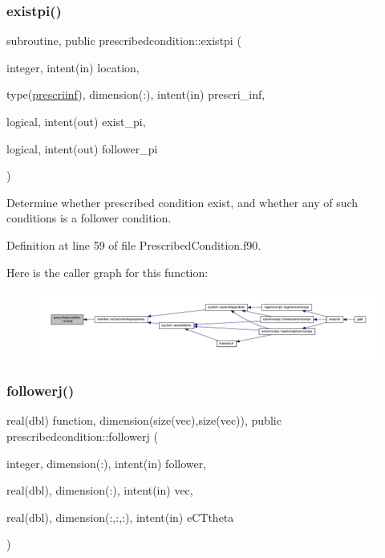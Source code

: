\subsubsection{\texorpdfstring{existpi()}{existpi()}}
{\footnotesize\ttfamily subroutine, public prescribedcondition\+::existpi (\begin{DoxyParamCaption}\item[{integer, intent(in)}]{location,  }\item[{type(\hyperlink{structprescribedcondition_1_1prescriinf}{prescriinf}), dimension(\+:), intent(in)}]{prescri\+\_\+inf,  }\item[{logical, intent(out)}]{exist\+\_\+pi,  }\item[{logical, intent(out)}]{follower\+\_\+pi }\end{DoxyParamCaption})}



Determine whether prescribed condition exist, and whether any of such conditions is a follower condition. 



Definition at line 59 of file Prescribed\+Condition.\+f90.

Here is the caller graph for this function\+:\nopagebreak
\begin{figure}[H]
\begin{center}
\leavevmode
\includegraphics[width=350pt]{namespaceprescribedcondition_acb722f1fdcfebc72bc33fb3162d9db6d_icgraph}
\end{center}
\end{figure}
\mbox{\label{namespaceprescribedcondition_a4c109cd4a8df6fedff99e15f448cf944}} 
\subsubsection{\texorpdfstring{followerj()}{followerj()}}
{\footnotesize\ttfamily real(dbl) function, dimension(size(vec),size(vec)), public prescribedcondition\+::followerj (\begin{DoxyParamCaption}\item[{integer, dimension(\+:), intent(in)}]{follower,  }\item[{real(dbl), dimension(\+:), intent(in)}]{vec,  }\item[{real(dbl), dimension(\+:,\+:,\+:), intent(in)}]{e\+C\+Ttheta }\end{DoxyParamCaption})}



